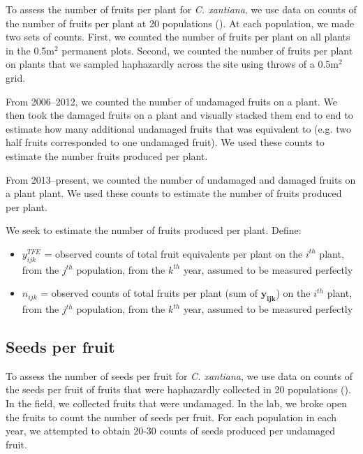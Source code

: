 \documentclass[12pt, oneside, titlepage]{article}   	%
\begin{document}
To assess the number of fruits per plant for \textit{C. xantiana}, we use data on counts of the number of fruits per plant at 20 populations (\cite{eckhart2011}). At each population, we made two sets of counts. First, we counted the number of fruits per plant on all plants in the 0.5m$^2$ permanent plots. Second, we counted the number of fruits per plant on plants that we sampled haphazardly across the site using throws of a 0.5m$^2$ grid.

From 2006--2012, we counted the number of undamaged fruits on a plant. We then took the damaged fruits on a plant and visually stacked them end to end to estimate how many additional undamaged fruits that was equivalent to (e.g. two half fruits corresponded to one undamaged fruit). We used these counts to estimate the number fruits produced per plant. 

From 2013--present, we counted the number of undamaged and damaged fruits on a plant plant. We used these counts to estimate the number of fruits produced per plant.

We seek to estimate the number of fruits produced per plant. Define: 

\begin{itemize}

	\item $y^{TFE}_{ijk}$ = observed counts of total fruit equivalents per plant on the $i^{th}$ plant, from the $j^{th}$ population, from the $k^{th}$ year, assumed to be measured perfectly
	\item $n_{ijk}$ = observed counts of total fruits per plant (sum of $\bm{y_{ijk}}$) on the $i^{th}$ plant, from the $j^{th}$ population, from the $k^{th}$ year, assumed to be measured perfectly
\end{itemize}

\subsection{Seeds per fruit}

To assess the number of seeds per fruit for \textit{C. xantiana}, we use data on counts of the seeds per fruit of fruits that were haphazardly collected in 20 populations (\cite{eckhart2011}). In the field, we collected fruits that were undamaged. In the lab, we broke open the fruits to count the number of seeds per fruit. For each population in each year, we attempted to obtain 20-30 counts of seeds produced per undamaged fruit. 
\end{document}
